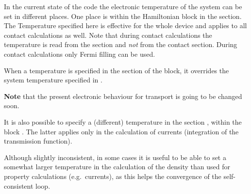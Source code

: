 In the current state of the code the electronic temperature of the system can be
set in different places. One place is within the Hamiltonian block in the
 section. The Temperature specified here is effective for the whole
device and applies to all contact calculations as well.  Note that during
contact calculations the temperature is read from the  section and
{\em not} from the contact section.  During contact calculations only Fermi
filling can be used.

When a temperature is specified in the  section of the
 block, it overrides the system temperature specified in
.

{\bf Note} that the present electronic behaviour for transport is going to be
changed soon.

It is also possible to specify a (different) temperature in the section
, within the block . The latter applies only in
the calculation of currents (integration of the transmission function).

Although slightly inconsistent, in some cases it is useful to be able to set a
somewhat larger temperature in the calculation of the density than used for
property calculations (e.g.\ currents), as this helps the convergence of the
self-consistent loop.


%

